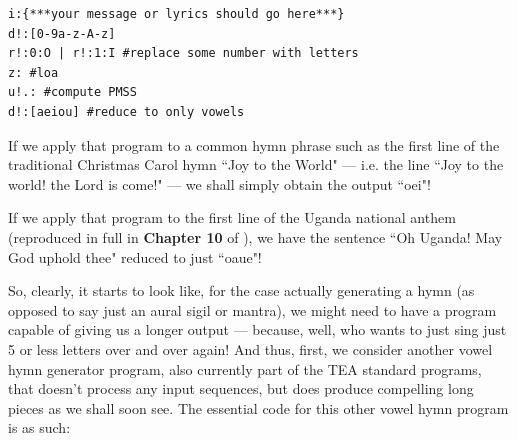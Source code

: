 \documentclass[a4paper, 18pt]{book} %
\begin{document}
{{{\begin{tcolorbox}[teaterminalstyle, title=TEA Application: MAGICAL VOWEL SOURCE GENERATOR, breakable]
\begin{lstlisting}[language=TEA,breaklines=true,]
i:{***your message or lyrics should go here***}
d!:[0-9a-z-A-z]
r!:0:O | r!:1:I #replace some number with letters
z: #loa
u!.: #compute PMSS
d!:[aeiou] #reduce to only vowels
   \end{lstlisting}
  \end{tcolorbox}
  \label{FIGTEAVOWELSRC}

\vspace{1em}
  

If we apply that program to a common hymn phrase such as the first line of the traditional Christmas Carol hymn ``Joy to the World" --- i.e. the line ``Joy to the world! the Lord is come!" --- we shall simply obtain the output ``oei"! 

\vspace{2em}

If we apply that program to the first line of the Uganda national anthem (reproduced in full in \textbf{Chapter 10} of \cite{lutalo2025rock}), we have the sentence ``Oh Uganda! May God uphold thee" reduced to just ``oaue"!

\vspace{2em}

So, clearly, it starts to look like, for the case actually generating a hymn (as opposed to say just an aural sigil or mantra), we might need to have a program capable of giving us a longer output --- because, well, who wants to just sing just 5 or less letters over and over again! And thus, first, we consider another vowel hymn generator program, also currently part of the TEA standard programs, that doesn't process any input sequences, but does produce compelling long pieces as we shall soon see. The essential code for this other vowel hymn program is as such:


  \vspace{1em}

}}}
\end{document}
